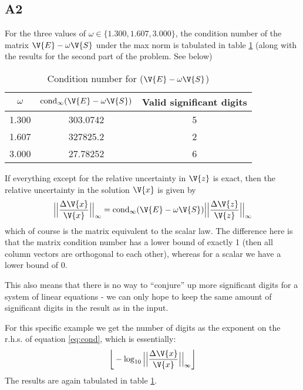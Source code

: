 \documentclass[a4paper,10pt]{article}
\begin{document}
	\subsection*{A2}
	For the three values of $ \omega \in \{1.300, 1.607, 3.000\} $, the condition number of the matrix $ \V{E}-\omega \V{S} $ under the max norm is tabulated in table \ref{tab:condition} (along with the results for the second part of the problem. See below)
	\begin{table}[H]
		\centering
		\begin{tabular}{c|c|c}
			$ \omega $ & $\text{cond}_{\infty}(\V{E}-\omega \V{S})$ & Valid significant digits\\
			\hline
			1.300 & 303.0742 & 5\\
			1.607 & 327825.2 & 2\\
			3.000 & 27.78252 & 6
		\end{tabular}
		\caption{Condition number for ($ \V{E}-\omega \V{S} $)}
		\label{tab:condition}
	\end{table}
	If everything except for the relative uncertainty in $ \V{z} $ is exact, then the relative uncertainty in the solution $ \V{x} $ is given by
	\begin{equation}\label{eq:cond}
		\Big|\Big|\frac{\Delta \V{x}}{\V{x}}\Big|\Big|_{\infty} = \text{cond}_{\infty} (\V{E}-\omega\V{S}) \Big|\Big|\frac{\Delta \V{z}}{\V{z}}\Big|\Big|_{\infty}
	\end{equation}
	which of course is the matrix equivalent to the scalar law. The difference here is that the matrix condition number has a lower bound of exactly 1 (then all column vectors are orthogonal to each other), whereas for a scalar we have a lower bound of 0.
	
	This also means that there is no way to ``conjure'' up more significant digits for a system of linear equations - we can only hope to keep the same amount of significant digits in the result as in the input.
	
	For this specific example we get the number of digits as the exponent on the r.h.s. of equation \ref{eq:cond}, which is essentially:
	\begin{equation}\label{eq:sigfig}
		\bigg\lfloor -\log_{10} \Big|\Big|\frac{\Delta \V{x}}{\V{x}}\Big|\Big|_{\infty}\bigg\rfloor
	\end{equation}
	The results are again tabulated in table \ref{tab:condition}.
	
\end{document}
